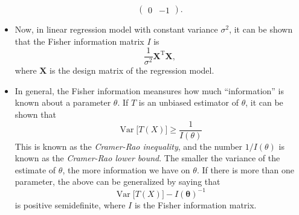 \documentclass[12pt]{article}
\begin{document}
\begin{itemize}
$$\begin{pmatrix}
0 & -1 
\end{pmatrix}.$$
\item 
Now, in linear regression model with constant variance $\sigma^2$, it can be shown that the Fisher information matrix $I$ is
$$\frac{1}{\sigma^2}\textbf{X}^{\operatorname{T}}\textbf{X},$$
where $\textbf{X}$ is the design matrix of the regression model.
\item 
In general, the Fisher information meansures how much ``information'' is known about a parameter $\theta$.  If $T$ is an unbiased estimator of $\theta$, it can be shown that 
$$\operatorname{Var}\big[T(X)\big]\ge\frac{1}{I(\theta)}$$
This is known as the \emph{Cramer-Rao inequality}, and the number $1/I(\theta)$ is known as the \emph{Cramer-Rao lower bound}.  The smaller the variance of the estimate of $\theta$, the more information we have on $\theta$.  If there is more than one parameter, the above can be generalized by saying that 
$$\operatorname{Var}\big[T(X)\big]-I(\boldsymbol{\theta})^{-1}$$ is positive semidefinite, where $I$ is the Fisher information matrix.
\end{itemize}
\end{document}
